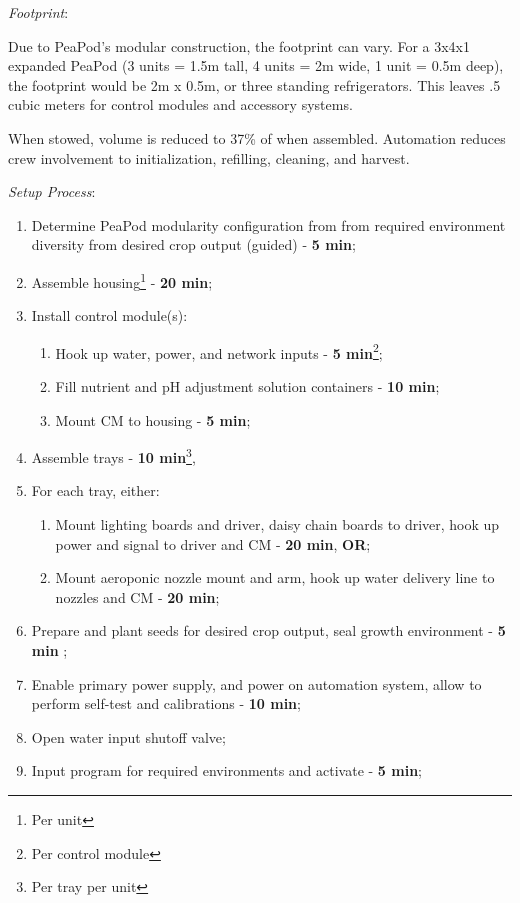 \documentclass{report}
\begin{document}


\textit{Footprint}:

Due to PeaPod's modular construction, the footprint can vary. For a 3x4x1 expanded PeaPod (3 units = 1.5m tall, 4 units = 2m wide, 1 unit = 0.5m deep), the footprint would be 2m x 0.5m, or three standing refrigerators. This leaves .5 cubic meters for control modules and accessory systems. 

When stowed, volume is reduced to 37\% of when assembled. Automation reduces crew involvement to initialization, refilling, cleaning, and harvest.

\textit{Setup Process}:

\begin{enumerate}
    \item Determine PeaPod modularity configuration from from required environment diversity from desired crop output (guided) - \textbf{5 min};
    \item Assemble housing\footnote{Per unit} - \textbf{20 min};
    \item Install control module(s):
    \begin{enumerate}
        \item Hook up water, power, and network inputs - \textbf{5 min}\footnote{Per control module};
        \item Fill nutrient and pH adjustment solution containers - \textbf{10 min}\footnotemark[2];
        \item Mount CM to housing - \textbf{5 min}\footnotemark[2];
    \end{enumerate}
    \item Assemble trays - \textbf{10 min}\footnote{Per tray per unit}, 
    \item For each tray, either:
    \begin{enumerate}
        \item Mount lighting boards and driver, daisy chain boards to driver, hook up power and signal to driver and CM - \textbf{20 min}\footnotemark[3], \textbf{OR};
        \item Mount aeroponic nozzle mount and arm, hook up water delivery line to nozzles and CM - \textbf{20 min}\footnotemark[3];
    \end{enumerate}
    \item Prepare and plant seeds for desired crop output, seal growth environment - \textbf{5 min} \footnotemark[1];
    \item Enable primary power supply, and power on automation system, allow to perform self-test and calibrations - \textbf{10 min}\footnotemark[2];
    \item Open water input shutoff valve;
    \item Input program for required environments and activate - \textbf{5 min}\footnotemark[2];
\end{enumerate}
\end{document}
